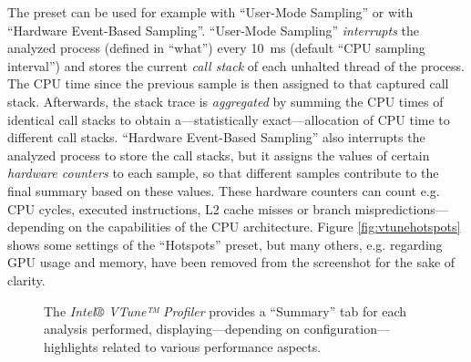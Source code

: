     The preset  can be used for example with ``User-Mode Sampling'' or with ``Hardware Event-Based Sampling''. ``User-Mode Sampling'' \emph{interrupts} the analyzed process (defined in ``what'') every \SI{10}{\milli\second} (default ``CPU sampling interval'') and stores the current \emph{call stack} of each unhalted thread of the process. The CPU time since the previous sample is then assigned to that captured call stack. Afterwards, the stack trace is \emph{aggregated} by summing the CPU times of identical call stacks to obtain a---statistically exact---allocation of CPU time to different call stacks. ``Hardware Event-Based Sampling'' also interrupts the analyzed process to store the call stacks, but it assigns the values of certain \emph{hardware counters} to each sample, so that different samples contribute to the final summary based on these values. These hardware counters can count e.g. CPU cycles, executed instructions, L2 cache misses or branch mispredictions---depending on the capabilities of the CPU architecture. Figure \ref{fig:vtunehotspots} shows some settings of the ``Hotspots'' preset, but many others, e.g. regarding GPU usage and memory, have been removed from the screenshot for the sake of clarity.

\begin{@empty}
    \setlength{\fboxsep}{0pt}%
    \setlength{\fboxrule}{1pt}%
    
    \begin{figure}[h!]
        \centering
        \vspace{.75em}
        \caption[Summary of an analysis done by the VTune™ Profiler]{The \textit{Intel® VTune™ Profiler} provides a ``Summary'' tab for each analysis performed, displaying---depending on configuration---highlights related to various performance aspects.}
        \label{fig:vtunesummary}
    \end{figure}
\end{@empty}

